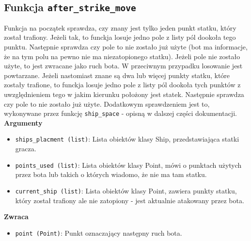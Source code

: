 \documentclass[12pt]{article}
\begin{document}
    \subsection{Funkcja \texttt{after\_strike\_move}}
    Funkcja na początek sprawdza, czy znany jest tylko jeden punkt statku, który został trafiony.
    Jeżeli tak, to funckja losuje jedno pole z listy pól dookoła tego punktu. Następnie sprawdza czy pole to nie zostało już użyte 
    (bot ma informacje, że na tym polu na pewno nie ma niezatopionego statku). Jeżeli pole nie zostało użyte, to jest zwracane jako ruch bota.
    W przeciwnym przypadku losowanie jest powtarzane. 
    Jeżeli nastomiast znane są dwa lub więcej punkty statku, które zostały trafione, to funckja losuje jedno pole z listy pól dookoła tych punktów 
    z uwzględnieniem tego w jakim kierunku położony jest statek. Następnie sprawdza czy pole to nie zostało już użyte.
    Dodatkowym sprawdzeniem jest to, wykonywane przez funkcję \texttt{ship\_space} - opisną w dalszej części dokumentacji.\\
    \textbf{Argumenty}
        \begin{itemize}
            \item \texttt{ships\_placment (list)}: Lista obiektów klasy Ship, przedstawiająca statki gracza.
            \item \texttt{points\_used (list)}: Lista obiektów klasy Point, mówi o punktach użytych przez bota lub takich o których wiadomo, że nie ma tam statku.
            \item \texttt{current\_ship (list)}: Lista obiektów klasy Point, zawiera punkty statku, który został trafiony ale nie zatopiony - jest aktualnie atakowany przez bota.
        \end{itemize}
    \textbf{Zwraca}
        \begin{itemize}
            \item \texttt{point (Point)}: Punkt oznaczający następny ruch bota.
        \end{itemize}
\end{document}
